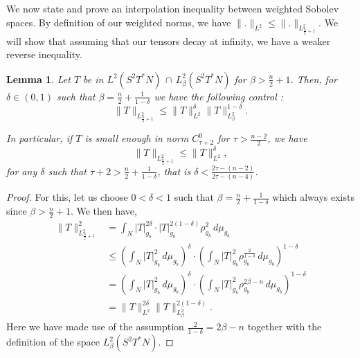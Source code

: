 \documentclass[a4paper,11pt,reqno]{amsart}
\newtheorem{lemma}[defn]{Lemma}
\numberwithin{equation}{section}
\begin{document}
	We now state and prove an interpolation inequality between weighted Sobolev spaces. By definition of our weighted norms, we have $\|.\|_{L^2}\leq \|.\|_{L^2_{\frac{n}{2}+1}}$. We will show that assuming that our tensors decay at infinity, we have a weaker reverse inequality.
	\begin{lemma}\label{lemma-interpol-delig}
		Let $T$ be in $L^2(S^2T^*N)\,\cap \,L^2_\beta(S^2T^*N)$ for $\beta>\frac{n}{2}+1$. Then, for $\delta\in(0,1)$ such that $\beta = \frac{n}{2}+\frac{1}{1-\delta}$ we have the following control :
		\begin{equation}
		\|T\|_{L^2_{\frac{n}{2}+1}}\leq \|T\|_{L^2}^\delta\|T\|_{L^2_\beta}^{1-\delta}.\label{interpolation L2}
		\end{equation}
	
		In particular, if $T$ is small enough in norm $C^0_{\tau+2}$ for $\tau>\frac{n-2}{2}$, we have $$\|T\|_{L^2_{\frac{n}{2}+1}}\leq \|T\|_{L^2}^\delta,$$ for any $\delta$ such that $ \tau+2> \frac{n}{2}+\frac{1}{1-\delta}$, that is $\delta<\frac{2\tau-(n-2)}{2\tau-(n-4)}$.
	\end{lemma}
	\begin{proof}
		For this, let us choose $0<\delta<1$ such that $\beta=\frac{n}{2}+\frac{1}{1-\delta}$ which always exists since $\beta>\frac{n}{2}+1$. We then have,
		\begin{align}
		\|T\|^2_{L^2_{\frac{n}{2}+1}} &= \int_{N}|T|_{g_b}^{2\delta}\cdot |T|_{g_b}^{2(1-\delta)}\rho_{g_b}^{2}\,d\mu_{g_b}\nonumber\\
		&\leq \left(\int_{N}|T|_{g_b}^2\,d\mu_{g_b}\right)^{\delta}\cdot\left(\int_{N}|T|_{g_b}^2\rho_{g_b}^{\frac{2}{1-\delta}}\,d\mu_{g_b}\right)^{1-\delta}\nonumber\\
		&=\left(\int_{N}|T|_{g_b}^2\,d\mu_{g_b}\right)^{\delta}\cdot\left(\int_{N}|T|_{g_b}^2\rho_{g_b}^{2\beta-n}\,d\mu_{g_b}\right)^{1-\delta}\nonumber\\
		&=\|T\|_{L^2}^{2\delta}\|T\|_{L^2_\beta}^{2(1-\delta)}\nonumber.
		\end{align}
		Here we have made use of the assumption $\frac{2}{1-\delta} = 2\beta-n$ together with the definition of the space $L^2_\beta(S^2T^*N)$.
	\end{proof}
	
\end{document}
